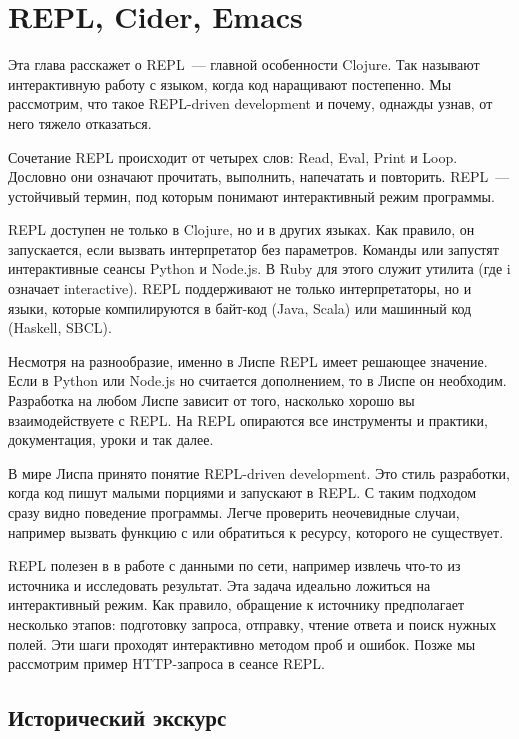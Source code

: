 \chapter{REPL, Cider, Emacs}

\begin{teaser}
Эта глава расскажет о REPL~--- главной особенности Clojure. Так называют интерактивную работу с языком, когда код наращивают постепенно. Мы рассмотрим, что такое REPL-driven development и почему, однажды узнав, от него тяжело отказаться.
\end{teaser}

Сочетание REPL происходит от четырех слов: Read, Eval, Print и Loop. Дословно они означают прочитать, выполнить, напечатать и повторить. REPL~--- устойчивый термин, под которым понимают интерактивный режим программы.

REPL доступен не только в Clojure, но и в других языках. Как правило, он запускается, если вызвать интерпретатор без параметров. Команды  или  запустят интерактивные сеансы Python и Node.js. В Ruby для этого служит утилита  (где i означает interactive). REPL поддерживают не только интерпретаторы, но и языки, которые компилируются в байт-код (Java, Scala) или машинный код (Haskell, SBCL).

Несмотря на разнообразие, именно в Лиспе REPL имеет решающее значение. Если в Python или Node.js но считается дополнением, то в Лиспе он необходим. Разработка на любом Лиспе зависит от того, насколько хорошо вы взаимодействуете с REPL. На REPL опираются все инструменты и практики, документация, уроки и так далее.

В мире Лиспа принято понятие REPL-driven development. Это стиль разработки, когда код пишут малыми порциями и запускают в REPL. С таким подходом сразу видно поведение программы. Легче проверить неочевидные случаи, например вызвать функцию с  или обратиться к ресурсу, которого не существует.

REPL полезен в в работе с данными по сети, например извлечь что-то из источника и исследовать результат. Эта задача идеально ложиться на интерактивный режим. Как правило, обращение к источнику предполагает несколько этапов: подготовку запроса, отправку, чтение ответа и поиск нужных полей. Эти шаги проходят интерактивно методом проб и ошибок. Позже мы рассмотрим пример HTTP-запроса в сеансе REPL.

\section{Исторический экскурс}

